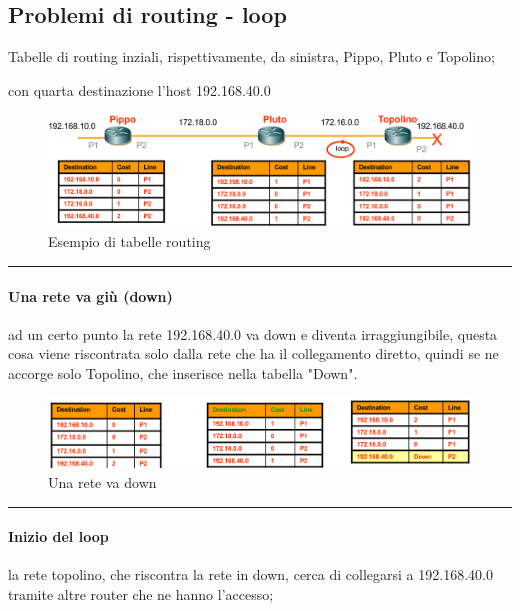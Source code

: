\newpage

\subsection{Problemi di routing - loop}
Tabelle di routing inziali, rispettivamente, da sinistra, Pippo, Pluto e Topolino; 

con quarta destinazione l'host 192.168.40.0

\begin{figure}[h!]
    \centering
    \includegraphics[width=1\textwidth]{images/problemaloop.png}
    \caption{Esempio di tabelle routing}
    \label{fig:problemaloop}
\end{figure}

\vspace{0.5em}
\noindent\rule{\linewidth}{0.4pt}
\vspace{0.5em}

\paragraph{Una rete va giù (down)} ad un certo punto la rete 192.168.40.0 va down e diventa irraggiungibile, questa cosa viene riscontrata solo dalla rete che ha il collegamento diretto, quindi se ne accorge solo Topolino, che inserisce nella tabella "Down".

\begin{figure}[h!]
    \centering
    \includegraphics[width=1\textwidth]{images/loop1.png}
    \caption{Una rete va down}
    \label{fig:problemaloop1}
\end{figure}

\vspace{0.5em}
\noindent\rule{\linewidth}{0.4pt}
\vspace{0.5em}

\paragraph{Inizio del loop} la rete topolino, che riscontra la rete in down, cerca di collegarsi a 192.168.40.0 tramite altre router che ne hanno l'accesso;

